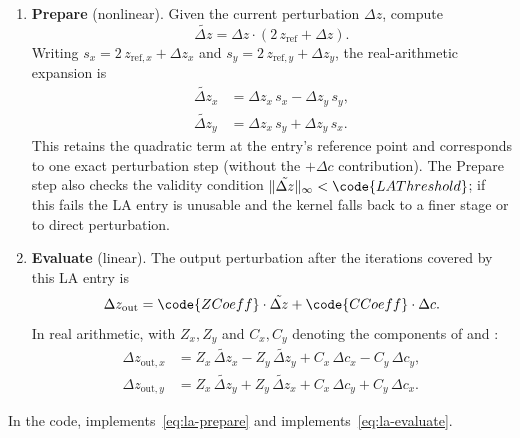 \begin{enumerate}
  \item \textbf{Prepare} (nonlinear).  Given the current perturbation
        \(\Delta z\), compute
        \begin{equation}
        \tilde{\Delta z} = \Delta z\cdot(2\,z_\mathrm{ref} + \Delta z).
        \label{eq:la-prepare}
        \end{equation}
        Writing $s_x = 2\,z_{\mathrm{ref},x} + \Delta z_x$ and
        $s_y = 2\,z_{\mathrm{ref},y} + \Delta z_y$, the real-arithmetic
        expansion is
        \begin{align}
        \tilde{\Delta z}_x &= \Delta z_x\,s_x - \Delta z_y\,s_y, \\
        \tilde{\Delta z}_y &= \Delta z_x\,s_y + \Delta z_y\,s_x.
        \end{align}
        This retains the quadratic term at the entry's reference point and
        corresponds to one exact perturbation step (without the
        \(+\Delta c\) contribution).  The Prepare step also checks the
        validity condition
        \(\lVert\tilde{\Delta z}\rVert_\infty < \code{LAThreshold}\);
        if this fails the LA entry is unusable and the kernel falls back
        to a finer stage or to direct perturbation.

  \item \textbf{Evaluate} (linear).  The output perturbation after the
        iterations covered by this LA entry is
        \begin{equation}
        \Delta z_\mathrm{out}
          = \code{ZCoeff}\cdot\tilde{\Delta z}
          + \code{CCoeff}\cdot\Delta c.
        \label{eq:la-evaluate}
        \end{equation}
        In real arithmetic, with $Z_x,Z_y$ and $C_x,C_y$ denoting the components
        of  and :
        \begin{align}
        \Delta z_{\mathrm{out},x}
          &= Z_x\,\tilde{\Delta z}_x - Z_y\,\tilde{\Delta z}_y
           + C_x\,\Delta c_x - C_y\,\Delta c_y, \\
        \Delta z_{\mathrm{out},y}
          &= Z_x\,\tilde{\Delta z}_y + Z_y\,\tilde{\Delta z}_x
           + C_x\,\Delta c_y + C_y\,\Delta c_x.
        \end{align}
\end{enumerate}
In the code,  implements~\cref{eq:la-prepare}
and  implements~\cref{eq:la-evaluate}.

